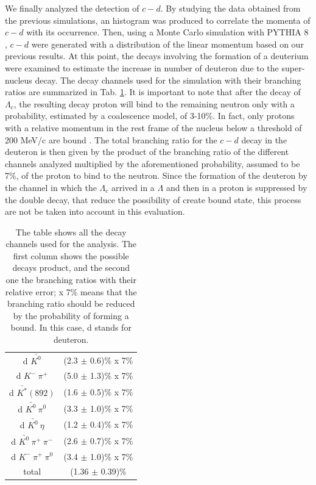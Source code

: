 \documentclass[12pt,a4paper]{book}
\begin{document}
	
	We finally analyzed the detection of $c-d$. By studying the data obtained from the previous simulations, an histogram was produced to correlate the momenta of $c-d$ with its occurrence. Then, using a Monte Carlo simulation with PYTHIA 8 \cite{biderman2023pythiasuiteanalyzinglarge}, $c-d$ were generated with a distribution of the linear momentum based on our previous results. At this point, the decays involving the formation of a deuterium were examined to estimate the increase in number of deuteron due to the super-nucleus decay. The decay channels used for the simulation with their branching ratios are summarized in Tab. \ref{tab:decay_channel}. It is important to note that after the decay of $\Lambda_c$, the resulting decay proton will bind to the remaining neutron only with a probability, estimated by a coalescence model, of 3-10\%. In fact, only protons with a relative momentum in the rest frame of the nucleus below a threshold of 200 MeV/c are bound \cite{alicecollaboration2022letterintentalice3}. The total branching ratio for the $c-d$ decay in the deuteron is then given by the product of the branching ratio of the different channels analyzed multiplied by the aforementioned probability, assumed to be 7\%, of the proton to bind to the neutron. Since the formation of the deuteron by the channel in which the $\Lambda_c$ arrived in a $\Lambda$ and then in a proton is suppressed by the double decay, that reduce the possibility of create bound state, this process are not be taken into account in this evaluation.
	\begin{table}[h]
		\centering
		\begin{tabular}{c|c}
			\hline
			\cellcolor{yellow} \text{Channel} & \cellcolor{yellow} \text{Branching ratio} \\
			\hline
			d $\bar{K^0}$ & (2.3 $\pm$ 0.6)\% x 7\% \\
			\hline
			d $K^- \ \pi^+$ &  (5.0 $\pm$ 1.3)\% x 7\% \\
			\hline
			d $\bar{K^*}(892)$ &  (1.6 $\pm$ 0.5)\% x 7\% \\
			\hline
			d $\bar{K^0} \ \pi^0$ &  (3.3 $\pm$ 1.0)\% x 7\% \\
			\hline
			d $\bar{K^0} \ \eta$ &  (1.2 $\pm$ 0.4)\% x 7\% \\
			\hline
			d $\bar{K^0} \ \pi^+ \ \pi^-$ &  (2.6 $\pm$ 0.7)\% x 7\% \\
			\hline
			d $K^- \ \pi^+ \ \pi^0$ &  (3.4 $\pm$ 1.0)\% x 7\% \\
			\hline
			total & (1.36 $\pm$ 0.39)\% \\
			\hline
		\end{tabular}
		\caption{The table shows all the decay channels used for the analysis. The first column shows the possible decays product, and the second one the branching ratios with their relative error; x 7\% means that the branching ratio should be reduced by the probability of forming a bound. In this case, d stands for deuteron.}
		\label{tab:decay_channel}
	\end{table}
	
\end{document}

